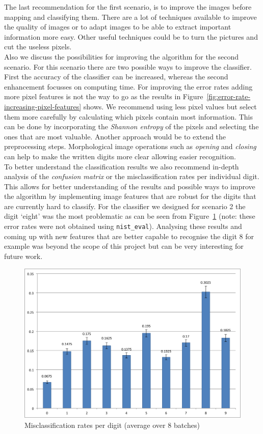 \documentclass{article}
\begin{document}
The last recommendation for the first scenario, is to improve the images before mapping and classifying them. There are a lot of techniques available to improve the quality of images or to adapt images to be able to extract important information more easy. Other useful techniques could be to turn the pictures and cut the useless pixels. \\

Also we discuss the possibilities for improving the algorithm for the second scenario. For this scenario there are two possible ways to improve the classifier. First the accuracy of the classifier can be increased, whereas the second enhancement focusses on computing time. For improving the error rates adding more pixel features is not the way to go as the results in Figure~\ref{fig:error-rate-increasing-pixel-features} shows. We recommend using less pixel values but select them more carefully by calculating which pixels contain most information. This can be done by incorporating the \emph{Shannon entropy} of the pixels and selecting the ones that are most valuable. Another approach would be to extend the preprocessing steps. Morphological image operations such as \emph{opening} and \emph{closing} can help to make the written digits more clear allowing easier recognition. \\

To better understand the classification results we also recommend in-depth analysis of the \emph{confusion matrix} or the misclassification rates per individual digit. This allows for better understanding of the results and possible ways to improve the algorithm by implementing image features that are robust for the digits that are currently hard to classify. For the classifier we designed for scenario 2 the digit `eight' was the most problematic as can be seen from Figure~\ref{fig:digit-misclassification} (note: these error rates were not obtained using \texttt{nist\_eval}). Analysing these results and coming up with new features that are better capable to recognise the digit $8$ for example was beyond the scope of this project but can be very interesting for future work.

\begin{figure}[H]
    \center
    \includegraphics[width=.7\textwidth]{misclassification-digits}
    \caption{Misclassification rates per digit (average over $8$ batches) \label{fig:digit-misclassification}}
\end{figure}
\end{document}
